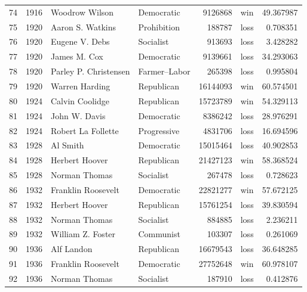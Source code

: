 \documentclass[
  letterpaper,
  DIV=11,
  numbers=noendperiod]{scrreprt}
\begin{document}
\begin{tabular}{lrllrlr}
74  &  1916 &          Woodrow Wilson &             Democratic &       9126868 &    win &  49.367987 \\
75  &  1920 &        Aaron S. Watkins &            Prohibition &        188787 &   loss &   0.708351 \\
76  &  1920 &          Eugene V. Debs &              Socialist &        913693 &   loss &   3.428282 \\
77  &  1920 &            James M. Cox &             Democratic &       9139661 &   loss &  34.293063 \\
78  &  1920 &   Parley P. Christensen &           Farmer–Labor &        265398 &   loss &   0.995804 \\
79  &  1920 &          Warren Harding &             Republican &      16144093 &    win &  60.574501 \\
80  &  1924 &         Calvin Coolidge &             Republican &      15723789 &    win &  54.329113 \\
81  &  1924 &           John W. Davis &             Democratic &       8386242 &   loss &  28.976291 \\
82  &  1924 &      Robert La Follette &            Progressive &       4831706 &   loss &  16.694596 \\
83  &  1928 &                Al Smith &             Democratic &      15015464 &   loss &  40.902853 \\
84  &  1928 &          Herbert Hoover &             Republican &      21427123 &    win &  58.368524 \\
85  &  1928 &           Norman Thomas &              Socialist &        267478 &   loss &   0.728623 \\
86  &  1932 &      Franklin Roosevelt &             Democratic &      22821277 &    win &  57.672125 \\
87  &  1932 &          Herbert Hoover &             Republican &      15761254 &   loss &  39.830594 \\
88  &  1932 &           Norman Thomas &              Socialist &        884885 &   loss &   2.236211 \\
89  &  1932 &       William Z. Foster &              Communist &        103307 &   loss &   0.261069 \\
90  &  1936 &              Alf Landon &             Republican &      16679543 &   loss &  36.648285 \\
91  &  1936 &      Franklin Roosevelt &             Democratic &      27752648 &    win &  60.978107 \\
92  &  1936 &           Norman Thomas &              Socialist &        187910 &   loss &   0.412876 \\

\end{tabular}
\end{document}
